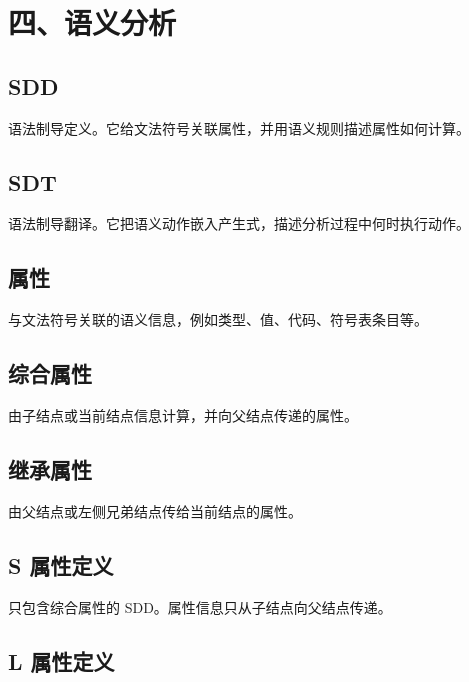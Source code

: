 \documentclass[UTF8,zihao=-4]{ctexart}
\begin{document}
\section*{四、语义分析}

\subsection*{SDD}

语法制导定义。它给文法符号关联属性，并用语义规则描述属性如何计算。

\subsection*{SDT}

语法制导翻译。它把语义动作嵌入产生式，描述分析过程中何时执行动作。

\subsection*{属性}

与文法符号关联的语义信息，例如类型、值、代码、符号表条目等。

\subsection*{综合属性}

由子结点或当前结点信息计算，并向父结点传递的属性。

\subsection*{继承属性}

由父结点或左侧兄弟结点传给当前结点的属性。

\subsection*{S 属性定义}

只包含综合属性的 SDD。属性信息只从子结点向父结点传递。

\subsection*{L 属性定义}
\end{document}
